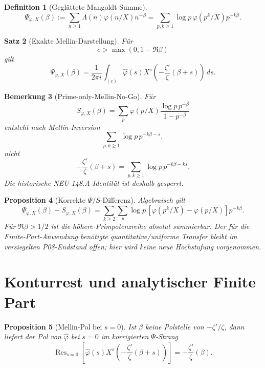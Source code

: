 \documentclass[11pt,a4paper]{amsart}
\newtheorem{theorem}{Satz}[section]
\newtheorem{proposition}[theorem]{Proposition}
\newtheorem{definition}[theorem]{Definition}
\newtheorem{remark}[theorem]{Bemerkung}
\begin{document}
\begin{definition}[Geglättete Mangoldt-Summe]\label{def:psi-smooth}
\[
  \Psi_{\varphi,X}(\beta)
  :=\sum_{n\ge1}\Lambda(n)\varphi(n/X)n^{-\beta}
  =\sum_{p,k\ge1}\log p\,\varphi(p^k/X)p^{-k\beta}.
\]
\end{definition}

\begin{theorem}[Exakte Mellin-Darstellung]\label{thm:psi-mellin}
Für
\[
  c>\max(0,1-\Re\beta)
\]
gilt
\[
  \Psi_{\varphi,X}(\beta)
  =\frac1{2\pi i}\int_{(c)}\widehat\varphi(s)X^s
  \left(-\frac{\zeta'}{\zeta}(\beta+s)\right)\,ds.
\]
\end{theorem}

\begin{remark}[Prime-only-Mellin-No-Go]\label{rem:s-mellin-nogo}
Für
\[
  S_{\varphi,X}(\beta)
  =\sum_p\varphi(p/X)\frac{\log p\,p^{-\beta}}{1-p^{-\beta}}
\]
entsteht nach Mellin-Inversion
\[
  \sum_{p,k\ge1}\log p\,p^{-k\beta-s},
\]
nicht
\[
  -\frac{\zeta'}{\zeta}(\beta+s)
  =\sum_{p,k\ge1}\log p\,p^{-k\beta-ks}.
\]
Die historische NEU-148.A-Identität ist deshalb gesperrt.
\end{remark}

\begin{proposition}[Korrekte $\Psi/S$-Differenz]\label{prop:psi-s-diff}
Algebraisch gilt
\[
  \Psi_{\varphi,X}(\beta)-S_{\varphi,X}(\beta)
  =\sum_{k\ge2}\sum_p\log p\,
  [\varphi(p^k/X)-\varphi(p/X)]p^{-k\beta}.
\]
Für $\Re\beta>1/2$ ist die höhere-Primpotenzreihe absolut summierbar. Der für
die Finite-Part-Anwendung benötigte quantitative/uniforme Transfer bleibt im
versiegelten P08-Endstand offen; hier wird keine neue Hochstufung vorgenommen.
\end{proposition}

\section{Konturrest und analytischer Finite Part}

\begin{proposition}[Mellin-Pol bei $s=0$]\label{prop:mellin-zero-pole}
Ist $\beta$ keine Polstelle von $-\zeta'/\zeta$, dann liefert der Pol von
$\widehat\varphi$ bei $s=0$ im korrigierten $\Psi$-Strang
\[
  \operatorname{Res}_{s=0}
  \left[
    \widehat\varphi(s)X^s
    \left(-\frac{\zeta'}{\zeta}(\beta+s)\right)
  \right]
  =-\frac{\zeta'}{\zeta}(\beta).
\]
\end{proposition}
\end{document}
